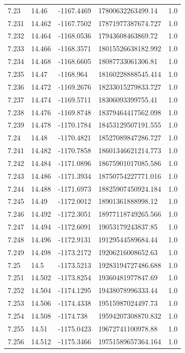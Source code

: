 \begin{tabular}{lllll}
7.23 & 14.46 & -1167.4469 & 17800632263499.14 & 1.0 \\
7.231 & 14.462 & -1167.7502 & 17871977387674.727 & 1.0 \\
7.232 & 14.464 & -1168.0536 & 17943608463869.72 & 1.0 \\
7.233 & 14.466 & -1168.3571 & 18015526638182.992 & 1.0 \\
7.234 & 14.468 & -1168.6605 & 18087733061306.81 & 1.0 \\
7.235 & 14.47 & -1168.964 & 18160228888545.414 & 1.0 \\
7.236 & 14.472 & -1169.2676 & 18233015279833.727 & 1.0 \\
7.237 & 14.474 & -1169.5711 & 18306093399755.41 & 1.0 \\
7.238 & 14.476 & -1169.8748 & 18379464417562.098 & 1.0 \\
7.239 & 14.478 & -1170.1784 & 18453129507191.555 & 1.0 \\
7.24 & 14.48 & -1170.4821 & 18527089847286.727 & 1.0 \\
7.241 & 14.482 & -1170.7858 & 18601346621214.773 & 1.0 \\
7.242 & 14.484 & -1171.0896 & 18675901017085.586 & 1.0 \\
7.243 & 14.486 & -1171.3934 & 18750754227771.016 & 1.0 \\
7.244 & 14.488 & -1171.6973 & 18825907450924.184 & 1.0 \\
7.245 & 14.49 & -1172.0012 & 18901361888998.12 & 1.0 \\
7.246 & 14.492 & -1172.3051 & 18977118749265.566 & 1.0 \\
7.247 & 14.494 & -1172.6091 & 19053179243837.85 & 1.0 \\
7.248 & 14.496 & -1172.9131 & 19129544589684.44 & 1.0 \\
7.249 & 14.498 & -1173.2172 & 19206216008652.63 & 1.0 \\
7.25 & 14.5 & -1173.5213 & 19283194727486.688 & 1.0 \\
7.251 & 14.502 & -1173.8254 & 19360481977847.69 & 1.0 \\
7.252 & 14.504 & -1174.1295 & 19438078996333.44 & 1.0 \\
7.253 & 14.506 & -1174.4338 & 19515987024497.73 & 1.0 \\
7.254 & 14.508 & -1174.738 & 19594207308870.832 & 1.0 \\
7.255 & 14.51 & -1175.0423 & 19672741100978.88 & 1.0 \\
7.256 & 14.512 & -1175.3466 & 19751589657364.164 & 1.0 \\

\end{tabular}
